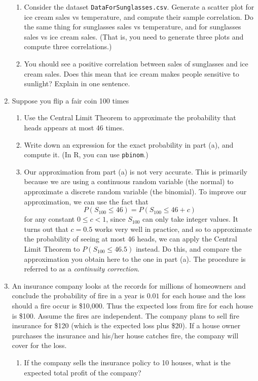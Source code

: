 \documentclass{article}    %
\begin{document}
\begin{enumerate}[leftmargin=0.55cm]
		\begin{enumerate}
			\item Consider the dataset \texttt{DataForSunglasses.csv}. Generate a scatter plot for ice cream sales vs temperature, and compute their sample correlation. Do the same thing for sunglasses sales vs temperature, and for sunglasses sales vs ice cream sales. (That is, you need to generate three plots and compute three correlations.)
			
			\item You should see a positive correlation between
			sales of sunglasses and ice cream sales. Does this mean that ice
			cream makes people sensitive to sunlight? Explain in one sentence.
		\end{enumerate}
		
		
		\item Suppose you flip a fair coin 100 times
		
		\begin{enumerate}
			\item Use the Central Limit Theorem to approximate the probability that heads appears at most 46 times. 
			
			
			\item Write down an expression for the
			exact probability in part (a), and compute it. (In
			R, you can use \texttt{pbinom}.)
			
			
			\item Our approximation from part (a) is not
			very accurate.  This is primarily because we are using a
			continuous random variable (the normal) to approximate a
			discrete random variable (the binomial). To improve our approximation, we can use the fact that$$
			P(S_{100}\leq 46)=P(S_{100}\leq 46+c)
			$$
			for any constant $0\leq c <1$, since $ S_{100} $ can only take integer values. It turns out that $c= 0.5$
			works very well in practice, and so to approximate the
			probability of seeing at most 46 heads, we can apply the
			Central Limit Theorem to $P(S_{100}\leq 46.5)$ instead.  Do
			this, and compare the approximation you obtain here to the one
			in part (a). The procedure is referred to as a \emph{continuity correction}.
			
			
			
		\end{enumerate}
		
		\item An insurance company looks at
		the records for millions of homeowners and conclude the
		probability of fire in a year is  $0.01$ for each house and
		the loss should a fire occur is \$10,000. Thus the expected loss from
		fire for each house is \$100. Assume the fires are
		independent. The company plans to sell fire insurance for
		\$120 (which is the expected loss plus \$20). If a house owner purchases the insurance and his/her house catches fire, the company will cover for the loss.
		\begin{enumerate}
			\item If the company sells the insurance policy to 10 houses, what is the expected total profit of the company?
			

\end{enumerate}
\end{enumerate}
\end{document}

